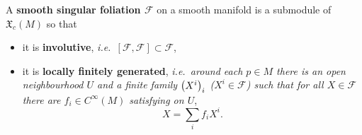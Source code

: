 \documentclass[
aspectratio=3218, 
10pt
]{beamer}
\def\bes{\begin{equation*}}
\def\ees{\end{equation*}}
\theoremstyle{plain}
\theoremstyle{remark}
\begin{document}
\begin{frame}
\begin{definition}\vspace{.5pt}
A \textbf{smooth singular foliation $\mathcal{F}$} on a smooth manifold is a submodule of $\mathfrak{X}_c(M)$ so that
\begin{itemize}
	\item it is \textbf{involutive}, \textit{i.e.\ $[\mathcal{F}, \mathcal{F}] \subset \mathcal{F}$},
	\item it is \textbf{locally finitely generated}, \textit{i.e.\ around each $p \in M$ there is an open neighbourhood $U$ and a finite family $\mleft( X^i \mright)_i$ ($X^i \in \mathcal{F}$) such that for all $X \in \mathcal{F}$ there are $f_i \in C^\infty(M)$ satisfying on $U$},
	\bes
	X = \sum_i f_i X^i.
	\ees
\end{itemize}
\end{definition}
\end{frame}

%
%
%
%

%
\end{document}
